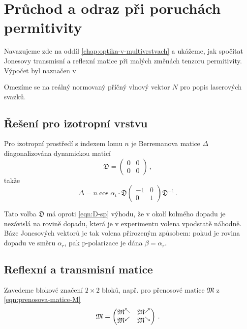 \section{Průchod a odraz při poruchách permitivity}
\label{app:berreman}

Navazujeme zde na oddíl \ref{chap:optika-v-multivrstvach} a ukážeme, jak spočítat Jonesovy transmisní a reflexní matice při malých změnách tenzoru permitivity.
Výpočet byl naznačen v 

Omezíme se na reálný normovaný příčný vlnový vektor $N$ pro popis laserových svazků.

\subsection*{Řešení pro izotropní vrstvu}

Pro izotropní prostředí s indexem lomu $n$ je Berremanova matice $\Delta$ diagonalizována dynamickou maticí
\begin{equation}
    \mathfrak{D} = \begin{pmatrix} 0&0\\0&0 \end{pmatrix} \,,
\end{equation}
takže
\begin{equation}
    \Delta = n\cos\alpha_t \cdot\mathfrak{D} \begin{pmatrix} -1&0\\0&1 \end{pmatrix} \mathfrak{D}^{-1} \,.
\end{equation}

Tato volba $\mathfrak{D}$ má oproti \eqref{eqn:D-sp} výhodu, že v okolí kolmého dopadu je nezávislá na rovině dopadu, která je v experimentu volena vpodstatě náhodně.
Báze Jonesových vektorů je tak volena přirozeným způsobem: pokud je rovina dopadu ve směru $\alpha_r$, pak p-polarizace je dána $\beta=\alpha_r$.

\subsection*{Reflexní a transmisní matice}

Zavedeme blokové značení $2\times2$ bloků, např. pro přenosové matice $\mathfrak{M}$ z \eqref{eqn:prenosova-matice-M}
\begin{equation}
    \mathfrak{M} = \begin{pmatrix} \mathfrak{M}^\nwarrow & \mathfrak{M}^\nearrow \\
    \mathfrak{M}^\swarrow & \mathfrak{M}^\searrow \end{pmatrix} \,.
\end{equation}

